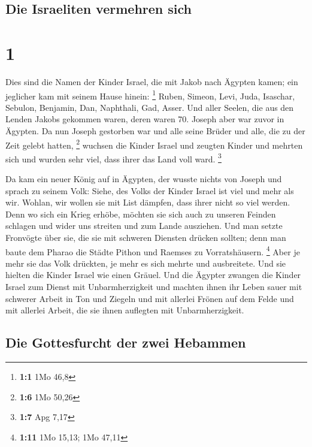 \hypertarget{die-israeliten-vermehren-sich}{%
\subsection{Die Israeliten vermehren
sich}\label{die-israeliten-vermehren-sich}}

\hypertarget{section}{%
\section{1}\label{section}}

 Dies sind die Namen der Kinder Israel, die mit Jakob nach
Ägypten kamen; ein jeglicher kam mit seinem Hause hinein: \footnote{\textbf{1:1}
  1Mo 46,8}  Ruben, Simeon, Levi, Juda, 
Isaschar, Sebulon, Benjamin,  Dan, Naphthali, Gad, Asser.
 Und aller Seelen, die aus den Lenden Jakobs gekommen
waren, deren waren 70. Joseph aber war zuvor in Ägypten. 
Da nun Joseph gestorben war und alle seine Brüder und alle, die zu der
Zeit gelebt hatten, \footnote{\textbf{1:6} 1Mo 50,26} 
wuchsen die Kinder Israel und zeugten Kinder und mehrten sich und wurden
sehr viel, dass ihrer das Land voll ward. \footnote{\textbf{1:7} Apg
  7,17}

 Da kam ein neuer König auf in Ägypten, der wusste nichts
von Joseph  und sprach zu seinem Volk: Siehe, des Volks
der Kinder Israel ist viel und mehr als wir.  Wohlan, wir
wollen sie mit List dämpfen, dass ihrer nicht so viel werden. Denn wo
sich ein Krieg erhöbe, möchten sie sich auch zu unseren Feinden schlagen
und wider uns streiten und zum Lande ausziehen.  Und man
setzte Fronvögte über sie, die sie mit schweren Diensten drücken
sollten; denn man baute dem Pharao die Städte Pithon und Raemses zu
Vorratshäusern. \footnote{\textbf{1:11} 1Mo 15,13; 1Mo 47,11}
 Aber je mehr sie das Volk drückten, je mehr es sich
mehrte und ausbreitete. Und sie hielten die Kinder Israel wie einen
Gräuel.  Und die Ägypter zwangen die Kinder Israel zum
Dienst mit Unbarmherzigkeit  und machten ihnen ihr Leben
sauer mit schwerer Arbeit in Ton und Ziegeln und mit allerlei Frönen auf
dem Felde und mit allerlei Arbeit, die sie ihnen auflegten mit
Unbarmherzigkeit.

\hypertarget{die-gottesfurcht-der-zwei-hebammen}{%
\subsection{Die Gottesfurcht der zwei
Hebammen}\label{die-gottesfurcht-der-zwei-hebammen}}


